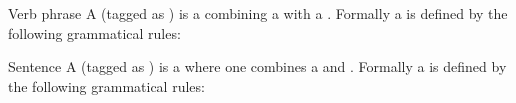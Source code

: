 \begin{df}[VP]{Verb phrase}
A \sb{} (tagged as ) is a  combining a  with a . Formally a \sb{} is defined by the following grammatical rules: 
\end{df}
\begin{df}[S]{Sentence}
A \sb{} (tagged as ) is a  where one combines a  and . Formally a \sb{} is defined by the following grammatical rules: 
\end{df}